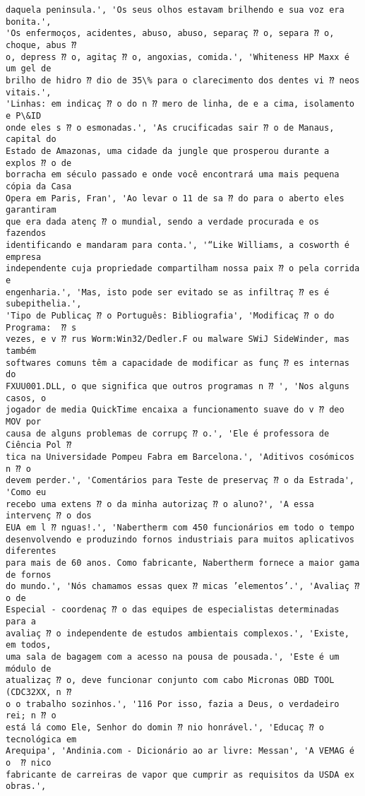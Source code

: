 \documentclass[10pt]{article}
\begin{document}
\begin{Verbatim}[commandchars=\\\{\}]
daquela peninsula.', 'Os seus olhos estavam brilhendo e sua voz era bonita.',
'Os enfermoços, acidentes, abuso, abuso, separaç ⁇ o, separa ⁇ o, choque, abus ⁇
o, depress ⁇ o, agitaç ⁇ o, angoxias, comida.', 'Whiteness HP Maxx é um gel de
brilho de hidro ⁇ dio de 35\% para o clarecimento dos dentes vi ⁇ neos vitais.',
'Linhas: em indicaç ⁇ o do n ⁇ mero de linha, de e a cima, isolamento e P\&ID
onde eles s ⁇ o esmonadas.', 'As crucificadas sair ⁇ o de Manaus, capital do
Estado de Amazonas, uma cidade da jungle que prosperou durante a explos ⁇ o de
borracha em século passado e onde você encontrará uma mais pequena cópia da Casa
Opera em Paris, Fran', 'Ao levar o 11 de sa ⁇ do para o aberto eles garantiram
que era dada atenç ⁇ o mundial, sendo a verdade procurada e os fazendos
identificando e mandaram para conta.', '“Like Williams, a cosworth é empresa
independente cuja propriedade compartilham nossa paix ⁇ o pela corrida e
engenharia.', 'Mas, isto pode ser evitado se as infiltraç ⁇ es é subepithelia.',
'Tipo de Publicaç ⁇ o Português: Bibliografia', 'Modificaç ⁇ o do Programa:  ⁇ s
vezes, e v ⁇ rus Worm:Win32/Dedler.F ou malware SWiJ SideWinder, mas também
softwares comuns têm a capacidade de modificar as funç ⁇ es internas do
FXUU001.DLL, o que significa que outros programas n ⁇ ', 'Nos alguns casos, o
jogador de media QuickTime encaixa a funcionamento suave do v ⁇ deo MOV por
causa de alguns problemas de corrupç ⁇ o.', 'Ele é professora de Ciência Pol ⁇
tica na Universidade Pompeu Fabra em Barcelona.', 'Aditivos cosómicos n ⁇ o
devem perder.', 'Comentários para Teste de preservaç ⁇ o da Estrada', 'Como eu
recebo uma extens ⁇ o da minha autorizaç ⁇ o aluno?', 'A essa intervenç ⁇ o dos
EUA em l ⁇ nguas!.', 'Nabertherm com 450 funcionários em todo o tempo
desenvolvendo e produzindo fornos industriais para muitos aplicativos diferentes
para mais de 60 anos. Como fabricante, Nabertherm fornece a maior gama de fornos
do mundo.', 'Nós chamamos essas quex ⁇ micas ’elementos’.', 'Avaliaç ⁇ o de
Especial - coordenaç ⁇ o das equipes de especialistas determinadas para a
avaliaç ⁇ o independente de estudos ambientais complexos.', 'Existe, em todos,
uma sala de bagagem com a acesso na pousa de pousada.', 'Este é um módulo de
atualizaç ⁇ o, deve funcionar conjunto com cabo Micronas OBD TOOL (CDC32XX, n ⁇
o o trabalho sozinhos.', '116 Por isso, fazia a Deus, o verdadeiro rei; n ⁇ o
está lá como Ele, Senhor do domin ⁇ nio honrável.', 'Educaç ⁇ o tecnológica em
Arequipa', 'Andinia.com - Dicionário ao ar livre: Messan', 'A VEMAG é o  ⁇ nico
fabricante de carreiras de vapor que cumprir as requisitos da USDA ex obras.',

\end{Verbatim}
\end{document}
